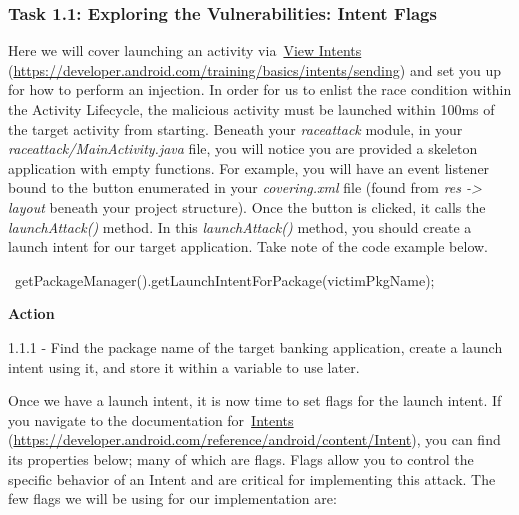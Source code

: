 \documentclass[letterpaper,12pt]{report}
\begin{document}
\subsubsection*{Task 1.1: Exploring the Vulnerabilities: Intent Flags}\label{sec:Task-1.1-Exploring-the-Vulnerabilities-Intent-Flags}

Here we will cover launching an activity via~\href{https://developer.android.com/training/basics/intents/sending}{View Intents} (\url{https://developer.android.com/training/basics/intents/sending}) and set you up for how to perform an injection. In order for us to enlist the race condition within the Activity Lifecycle, the malicious activity must be launched within 100ms of the target activity from starting. Beneath your \emph{raceattack} module, in your \emph{raceattack/MainActivity.java} file, you will notice you are provided a skeleton application with empty functions. For example, you will have an event listener bound to the button enumerated in your \emph{covering.xml} file (found from \emph{res -> layout} beneath your project structure). Once the button is clicked, it calls the \emph{launchAttack()} method. In this \emph{launchAttack()} method, you should create a launch intent for our target application. Take note of the code example below.

\bigskip
\begin{mdframed}[backgroundcolor=black!10,style=code,nobreak=true,align=center,userdefinedwidth=14cm]
\ getPackageManager().getLaunchIntentForPackage(victimPkgName);
\end{mdframed}

\bigskip
\begin{mdframed}[backgroundcolor=blue!10,style=code,nobreak=true,align=center,userdefinedwidth=14cm]
\textbf{Action}
\bigskip

1.1.1 - Find the package name of the target banking application, create a launch intent using it, and store it within a variable to use later.
\end{mdframed}

Once we have a launch intent, it is now time to set flags for the launch intent. If you navigate to the documentation for~\href{https://developer.android.com/reference/android/content/Intent}{Intents} (\url{https://developer.android.com/reference/android/content/Intent}), you can find its properties below; many of which are flags. Flags allow you to control the specific behavior of an Intent and are critical for implementing this attack. The few flags we will be using for our implementation are:
\end{document}

